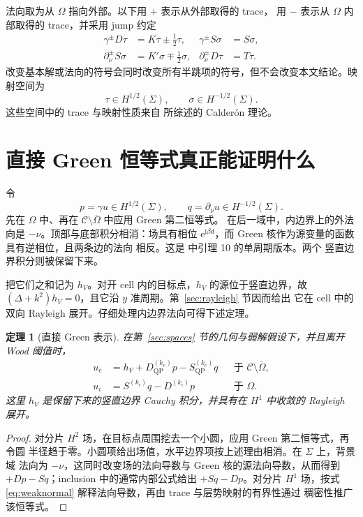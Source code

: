 \documentclass[UTF8,11pt,fontset=fandol]{ctexart}
\newcommand{\C}{\mathcal C}
\newcommand{\Om}{\Omega}
\newcommand{\Sig}{\Sigma}
\newcommand{\ii}{\mathrm i}
\newcommand{\ee}{\mathrm e}
\newcommand{\QP}{\mathrm{QP}}
\theoremstyle{plain}
\newtheorem{theorem}{定理}[section]
\theoremstyle{definition}
\theoremstyle{remark}
\begin{document}
法向取为从 \(\Om\) 指向外部。以下用 \(+\) 表示从外部取得的 trace，
用 \(-\) 表示从 \(\Om\) 内部取得的 trace，并采用 jump 约定
\begin{align}
\gamma^\pm D\tau&=K\tau\pm\tfrac12\tau,
&\gamma^\pm S\sigma&=S\sigma,\label{eq:jumps1}\\
\partial_\nu^\pm S\sigma&=K'\sigma\mp\tfrac12\sigma,
&\partial_\nu^\pm D\tau&=T\tau.\label{eq:jumps2}
\end{align}
改变基本解或法向的符号会同时改变所有半跳项的符号，但不会改变本文结论。映射空间为
\[
\tau\in H^{1/2}(\Sig),\qquad \sigma\in H^{-1/2}(\Sig).
\]
这些空间中的 trace 与映射性质来自 \cite[第 3--4 节]{DominguezLyonTurc2016}
所综述的 Calderón 理论。

\section{直接 Green 恒等式真正能证明什么}
\label{sec:green}

令
\[
p=\gamma u\in H^{1/2}(\Sig),\qquad
q=\partial_\nu u\in H^{-1/2}(\Sig).
\]
先在 \(\Om\) 中、再在 \(\C\setminus\overline\Om\) 中应用 Green 第二恒等式。
在后一域中，内边界上的外法向是 \(-\nu\)。顶部与底部积分相消：场具有相位
\(\ee^{\ii\beta d}\)，而 Green 核作为源变量的函数具有逆相位，且两条边的法向
相反。这是 \cite[附录 A]{BarnettGreengard2010} 中引理 10 的单周期版本。两个
竖直边界积分则被保留下来。

把它们之和记为 \(h_V\)。对开 cell 内的目标点，\(h_V\) 的源位于竖直边界，故
\((\Delta+k^2)h_V=0\)，且它沿 \(y\) 准周期。第~\ref{sec:rayleigh} 节因而给出
它在 cell 中的双向 Rayleigh 展开。仔细处理内边界法向可得下述定理。

\begin{theorem}[直接 Green 表示]
\label{thm:directgreen}
在第~\ref{sec:spaces} 节的几何与弱解假设下，并且离开 Wood 阈值时，
\begin{align}
u_e&=h_V+D_{\QP}^{(k_e)}p-S_{\QP}^{(k_e)}q
&&\text{于 }\C\setminus\overline\Om,\label{eq:directext}\\
u_i&=S^{(k_i)}q-D^{(k_i)}p
&&\text{于 }\Om.\label{eq:directint}
\end{align}
这里 \(h_V\) 是保留下来的竖直边界 Cauchy 积分，并具有在 \(H^1\) 中收敛的
Rayleigh 展开。
\end{theorem}

\begin{proof}
对分片 \(H^2\) 场，在目标点周围挖去一个小圆，应用 Green 第二恒等式，再令圆
半径趋于零。小圆项给出场值，水平边界项按上述理由相消。在 \(\Sig\) 上，背景域
法向为 \(-\nu\)，这同时改变场的法向导数与 Green 核的源法向导数，从而得到
\(+Dp-Sq\)；inclusion 中的通常内部公式给出 \(+Sq-Dp\)。对分片 \(H^1\)
场，按式 \eqref{eq:weaknormal} 解释法向导数，再由 trace 与层势映射的有界性通过
稠密性推广该恒等式。
\end{proof}
\end{document}

